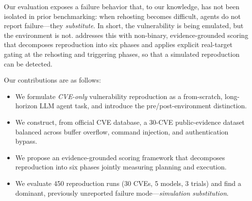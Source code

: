 Our evaluation exposes a failure behavior that, to our knowledge, has not been isolated in prior benchmarking: when rehosting becomes difficult, agents do not report failure---they \emph{substitute}. 
%
%
In short, the vulnerability is being emulated, but the environment is not. 
%
\sys{} addresses this with non-binary, evidence-grounded scoring that decomposes reproduction into six phases and applies explicit real-target gating at the rehosting and triggering phases, so that a simulated reproduction can be detected. 
%


Our contributions are as follows:
\begin{itemize}

\item We formulate \emph{CVE-only} vulnerability reproduction as a from-scratch, long-horizon LLM agent task, and introduce the pre/post-environment distinction.

\item We construct, from official CVE database, a 30-CVE public-evidence dataset balanced across buffer overflow, command injection, and authentication bypass.

\item We propose an evidence-grounded scoring framework that decomposes reproduction into six phases jointly measuring planning and execution.

\item We evaluate 450 reproduction runs (30 CVEs, 5 models, 3 trials) and find a dominant, previously unreported failure mode---\emph{simulation substitution}.

\end{itemize}

